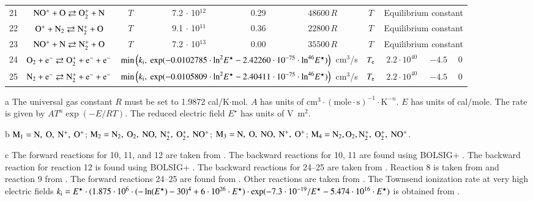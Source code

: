 \documentclass{warpdoc}
\begin{document}
\begin{table}[t]
\begin{center}
\begin{threeparttable}
\begin{tabular}{cccccccccc}
21 & $\rm NO^+ + O \rightleftarrows O_2^+ + N $ & $T$   & 7.2 $\cdot$ 10$^{12}$  & 0.29 & $48600 \, R$ & $T$ & \multicolumn{3}{c}{Equilibrium constant}\\

22 & $\rm O^+ + N_2 \rightleftarrows N_2^+ + O $ & $T$  & 9.1 $\cdot$ 10$^{11}$  & 0.36 & $22800 \, R$ & $T$  & \multicolumn{3}{c}{Equilibrium constant}\\

23 & $\rm NO^+ + N \rightleftarrows N_2^+ + O $  & $T$  & 7.2 $\cdot$ 10$^{13}$  & 0.00 & $35500 \, R$ & $T$ & \multicolumn{3}{c}{Equilibrium constant}\\

24 & $\rm O_2 + e^- \rightleftarrows O_2^+ + e^- + e^-$ &\multicolumn{4}{c}{$\min\left(k_{\rm i},~{\rm exp}(-0.0102785\cdot {\rm ln}^2 E^\star - 2.42260\cdot 10^{-75} \cdot {\rm ln}^{46}E^\star)\right)$~cm$^3$/s} 
                                          &$T_{\rm e}$ & $2.2 \cdot 10^{40}$  & $-4.5$  & 0\\
25 & $\rm N_2 + e^- \rightleftarrows N_2^+ + e^- + e^-$ &\multicolumn{4}{c}{$\min\left(k_{\rm i},~{\rm exp}(-0.0105809\cdot {\rm ln}^2 E^\star - 2.40411\cdot 10^{-75} \cdot {\rm ln}^{46}E^\star)\right)$~cm$^3$/s} 
                                          &$T_{\rm e}$ & $2.2 \cdot 10^{40}$  & $-4.5$  & 0\\
\bottomrule
\end{tabular}
\begin{tablenotes}
\item[{a}] The universal gas constant $R$ must be set to 1.9872	cal/K$\cdot$mol. $A$ has units of $\textrm{cm}^3\cdot(\textrm{mole}\cdot \textrm{s})^{-1}\cdot \textrm{K}^{-n}$. $E$ has units of cal/mole. The rate is given by $A T^n \exp(-E/RT).$ The reduced electric field $E^\star$ has units of V~m$^2$.
\item[{b}] $\rm M_1=N,~O,~N^+,~O^+$; $\rm M_2=N_2,~O_2,~NO,~N_2^+,~O_2^+,~NO^+$; $\rm M_3= N,~O,~NO,~N^+,~O^+$; $\rm M_4=N_2,O_2,N_2^+,~O_2^+,~NO^+$.
\item[{c}] The forward reactions for 10, 11, and 12 are taken from \cite{pf:2007:boyd}. The backward reactions for 10, 11 are found using BOLSIG+ \cite{psst:2005:hagelaar,jgr:1974:walls}. The backward reaction for reaction 12 is found using BOLSIG+ \cite{psst:2005:hagelaar,jap:2021:abdoulanziz}. The backward reactions for 24--25 are taken from \cite{nasa:1973:dunn}. Reaction 8 is taken from \cite{jcp:1997:bose} and reaction 9 from \cite{jcp:1996:bose}. The forward reactions 24--25 are found from \cite{jcp:2014:parent}. Other reactions are taken from \cite{book:1990:park}. The Townsend ionization rate at very high electric fields $k_{\rm i}=E^\star\cdot(1.875\cdot 10^6 \cdot (-\ln (E^\star)-30)^4+6\cdot 10^{26}\cdot E^\star)\cdot \exp(-7.3\cdot 10^{-19}/E^\star - 5.474\cdot 10^{16}\cdot E^\star)$ is obtained from \cite{ps:2005:tarasenko}.
\end{tablenotes}
\label{tab:parent2023b}
\end{threeparttable}
\end{center}
\end{table}
%
\end{document}
